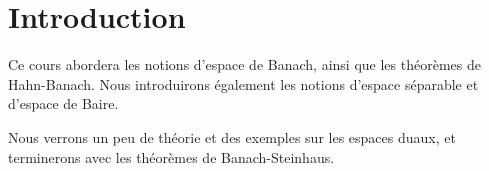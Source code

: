 \chapter*{Introduction}

Ce cours abordera les notions d'espace de Banach, ainsi que les théorèmes de
Hahn-Banach.
Nous introduirons également les notions d'espace séparable et d'espace de Baire.

Nous verrons un peu de théorie et des exemples sur les espaces duaux, et
terminerons avec les théorèmes de Banach-Steinhaus.
